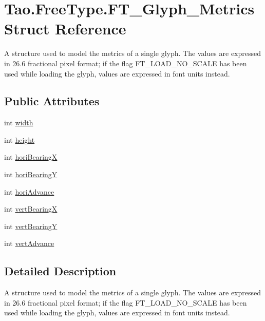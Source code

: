 \hypertarget{struct_tao_1_1_free_type_1_1_f_t___glyph___metrics}{
\section{Tao.FreeType.FT\_\-Glyph\_\-Metrics Struct Reference}
\label{struct_tao_1_1_free_type_1_1_f_t___glyph___metrics}
}


A structure used to model the metrics of a single glyph. The values are expressed in 26.6 fractional pixel format; if the flag FT\_\-LOAD\_\-NO\_\-SCALE has been used while loading the glyph, values are expressed in font units instead.  


\subsection*{Public Attributes}
\begin{DoxyCompactItemize}
\item 
int \hyperlink{struct_tao_1_1_free_type_1_1_f_t___glyph___metrics_a5f0463a0f32a8b71b5f5fc83e6a1d04b}{width}
\item 
int \hyperlink{struct_tao_1_1_free_type_1_1_f_t___glyph___metrics_a2fee439a52380202579fe587fd935f7c}{height}
\item 
int \hyperlink{struct_tao_1_1_free_type_1_1_f_t___glyph___metrics_a17e6ba01d15c3f386c9d66a3f8a3262b}{horiBearingX}
\item 
int \hyperlink{struct_tao_1_1_free_type_1_1_f_t___glyph___metrics_ad8a3bb6634c9153b713b40c18b3f6107}{horiBearingY}
\item 
int \hyperlink{struct_tao_1_1_free_type_1_1_f_t___glyph___metrics_af9ff78ec8d2cdf9a6ed179c31f97b87f}{horiAdvance}
\item 
int \hyperlink{struct_tao_1_1_free_type_1_1_f_t___glyph___metrics_a5f90f14ea60bde77d04b7b3b99a7b343}{vertBearingX}
\item 
int \hyperlink{struct_tao_1_1_free_type_1_1_f_t___glyph___metrics_a458315c43e510e464f1e2f3b7842b32e}{vertBearingY}
\item 
int \hyperlink{struct_tao_1_1_free_type_1_1_f_t___glyph___metrics_a28247d9508c437d991e033500cc28f42}{vertAdvance}
\end{DoxyCompactItemize}


\subsection{Detailed Description}
A structure used to model the metrics of a single glyph. The values are expressed in 26.6 fractional pixel format; if the flag FT\_\-LOAD\_\-NO\_\-SCALE has been used while loading the glyph, values are expressed in font units instead. 

